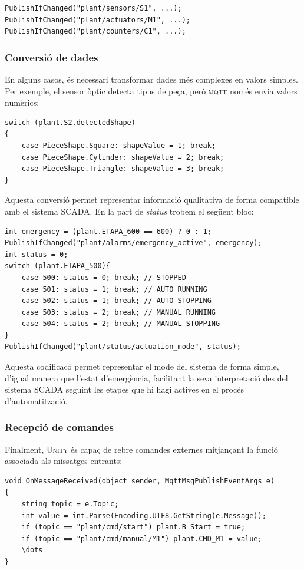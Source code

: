 \documentclass[a4paper,11pt,DIV=13,headings=normal,abstract=true,twoside=semi]{article}
\newcommand{\acro}[1]{\textsc{#1}}
\begin{document}
\begin{lstlisting}[style=simple]
PublishIfChanged("plant/sensors/S1", ...);
PublishIfChanged("plant/actuators/M1", ...);
PublishIfChanged("plant/counters/C1", ...);
\end{lstlisting}

\subsubsection{Conversió de dades}

En alguns casos, és necessari transformar dades més complexes en valors simples. Per exemple, el sensor òptic detecta tipus de peça, però \acro{mqtt} només envia valors numèrics:

\begin{lstlisting}[style=simple]
switch (plant.S2.detectedShape)
{
    case PieceShape.Square: shapeValue = 1; break;
    case PieceShape.Cylinder: shapeValue = 2; break;
    case PieceShape.Triangle: shapeValue = 3; break;
}
\end{lstlisting}

Aquesta conversió permet representar informació qualitativa de forma compatible amb el sistema \acro{SCADA}. En la part de \emph{status} trobem el següent bloc:
\begin{lstlisting}[style=simple]
int emergency = (plant.ETAPA_600 == 600) ? 0 : 1;
PublishIfChanged("plant/alarms/emergency_active", emergency);
int status = 0;
switch (plant.ETAPA_500){
    case 500: status = 0; break; // STOPPED
    case 501: status = 1; break; // AUTO RUNNING
    case 502: status = 1; break; // AUTO STOPPING
    case 503: status = 2; break; // MANUAL RUNNING
    case 504: status = 2; break; // MANUAL STOPPING
}
PublishIfChanged("plant/status/actuation_mode", status);
\end{lstlisting}
 
Aquesta codificacó permet representar el mode del sistema de forma simple, d'igual manera que l'estat d'emergència, facilitant la seva interpretació des del sistema \acro{SCADA} seguint les etapes que hi hagi actives en el procés d'automatització.

\subsubsection{Recepció de comandes}

Finalment, \acro{Unity} és capaç de rebre comandes externes mitjançant la funció associada als missatges entrants:

\begin{lstlisting}[style=simple]
void OnMessageReceived(object sender, MqttMsgPublishEventArgs e)
{
    string topic = e.Topic;
    int value = int.Parse(Encoding.UTF8.GetString(e.Message));
    if (topic == "plant/cmd/start") plant.B_Start = true;
    if (topic == "plant/cmd/manual/M1") plant.CMD_M1 = value;
    \dots
}
\end{lstlisting}
\end{document}
